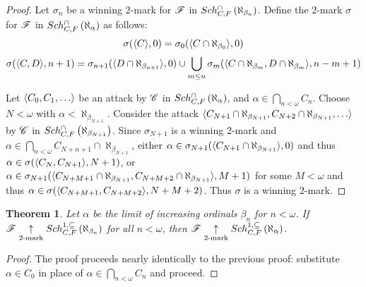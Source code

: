 \documentclass{amsart}
\theoremstyle{plain}
\newtheorem{theorem}{Theorem}
\theoremstyle{definition}
\theoremstyle{remark}
\theoremstyle{plain}
\theoremstyle{definition}
\theoremstyle{remark}
\begin{document}
  \begin{proof}
    Let \(\sigma_n\) be a winning \(2\)-mark for \(\mathscr{F}\) in
    \(Sch^{\cap}_{C,F}\left({\aleph_{\beta_n}}\right)\). Define the \(2\)-mark \(\sigma\)
    for \(\mathscr{F}\) in \(Sch^{\cap}_{C,F}\left({\aleph_\alpha}\right)\) as follows:
    \[
      \sigma(\langle C\rangle,0)
        =
      \sigma_0(\langle C\cap\aleph_{\beta_0}\rangle,0)
    \]
    \[
      \sigma(\langle C,D\rangle,n+1)
        =
      \sigma_{n+1}(\langle D\cap\aleph_{\beta_{n+1}}\rangle,0)
        \cup
      \bigcup_{m\leq n}
      \sigma_m(\langle C\cap\aleph_{\beta_m},D\cap\aleph_{\beta_m}\rangle,n-m+1)
    \]

    Let \(\<C_0,C_1,\dots\>\) be an attack by
    \(\mathscr{C}\) in \(Sch^{\cap}_{C,F}\left({\aleph_\alpha}\right)\), and
    \(\alpha\in\bigcap_{n<\omega}C_n\).
    Choose \(N<\omega\) with \(\alpha<\aleph_{\beta_{N+1}}\). Consider the
    attack
    \(\<C_{N+1}\cap\aleph_{\beta_{N+1}},C_{N+2}\cap\aleph_{\beta_{N+1}},\dots\>\)
    by \(\mathscr{C}\) in \(Sch^{\cap}_{C,F}\left({\aleph_{\beta_{N+1}}}\right)\). Since
    \(\sigma_{N+1}\) is a winning \(2\)-mark and
    \(\alpha\in\bigcap_{n<\omega}C_{N+n+1}\cap\aleph_{\beta_{N+1}}\), either
    \(\alpha\in\sigma_{N+1}(\langle C_{N+1}\cap\aleph_{\beta_{N+1}}\rangle,0)\) and thus
    \(\alpha\in\sigma(\langle C_N,C_{N+1}\rangle,N+1)\), or
    \(
      \alpha
        \in
      \sigma_{N+1}(
        \langle C_{N+M+1}\cap\aleph_{\beta_{N+1}},C_{N+M+2}\cap\aleph_{\beta_{N+1}}\rangle
        ,M+1
      )
    \)
    for some \(M<\omega\) and thus
    \(
      \alpha
        \in
      \sigma(
        \langle C_{N+M+1},C_{N+M+2}\rangle,
        N+M+2
      )
    \). Thus \(\sigma\) is a winning \(2\)-mark.
  \end{proof}

  \begin{theorem}
    Let \(\alpha\) be the limit of increasing ordinals \(\beta_n\) for \(n<\omega\).
    If \(\mathscr{F} \underset{2\text{-mark}}{\uparrow}Sch^{1,\subseteq}_{C,F}\left({\aleph_{\beta_n}}\right)\) for all
    \(n<\omega\), then \(\mathscr{F}\underset{2\text{-mark}}{\uparrow}Sch^{1,\subseteq}_{C,F}\left({\aleph_\alpha}\right)\).
  \end{theorem}

  \begin{proof}
    The proof proceeds nearly identically to the previous proof: substitute
    \(\alpha\in C_0\) in place of \(\alpha\in\bigcap_{n<\omega}C_n\) and proceed.
  \end{proof}
\end{document}

